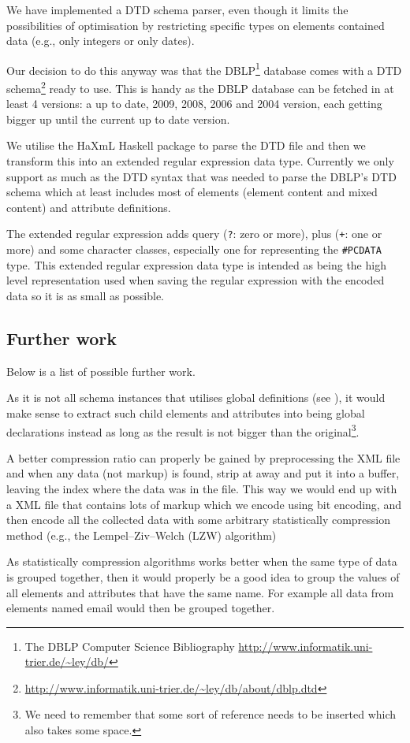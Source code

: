 \documentclass[a4paper, oneside]{memoir}
\theoremstyle{definition}
\begin{document}
We have implemented a DTD schema parser, even though it limits the possibilities
of optimisation by restricting specific types on elements contained data (e.g.,
only integers or only dates).

Our decision to do this anyway was that the DBLP\footnote{The DBLP Computer
  Science Bibliography \url{http://www.informatik.uni-trier.de/~ley/db/}}
database comes with a DTD
schema\footnote{\url{http://www.informatik.uni-trier.de/~ley/db/about/dblp.dtd}}
ready to use. This is handy as the DBLP database can be fetched in at least 4
versions: a up to date, 2009, 2008, 2006 and 2004 version, each getting bigger
up until the current up to date version.

We utilise the HaXmL Haskell package to parse the DTD file and then we transform
this into an extended regular expression data type. Currently we only support as
much as the DTD syntax that was needed to parse the DBLP's DTD schema which at
least includes most of elements (element content and mixed content) and
attribute definitions.

The extended regular expression adds query (\texttt{?}: zero or more), plus
(\texttt{+}: one or more) and some character classes, especially one for
representing the \texttt{\#PCDATA} type. This extended regular expression data
type is intended as being the high level representation used when saving the
regular expression with the encoded data so it is as small as possible.

\subsection{Further work}

Below is a list of possible further work.

\begin{description}
\item[Refactoring] As it is not all schema instances that utilises global
  definitions (see \label{sec:local-global-schema-definitions}), it would make
  sense to extract such child elements and attributes into being global
  declarations instead as long as the result is not bigger than the
  original\footnote{We need to remember that some sort of reference needs to be inserted
    which also takes some space.}.


\item A better compression ratio can properly be gained by preprocessing the XML
  file and when any data (not markup) is found, strip at away and put it into a
  buffer, leaving the index where the data was in the file. This way we would
  end up with a XML file that contains lots of markup which we encode using bit
  encoding, and then encode all the collected data with some arbitrary
  statistically compression method (e.g., the Lempel–Ziv–Welch (LZW) algorithm)

  As statistically compression algorithms works better when the same type of
  data is grouped together, then it would properly be a good idea to group the
  values of all elements and attributes that have the same name. For example all
  data from elements named email would then be grouped together.

\end{description}
\end{document}
